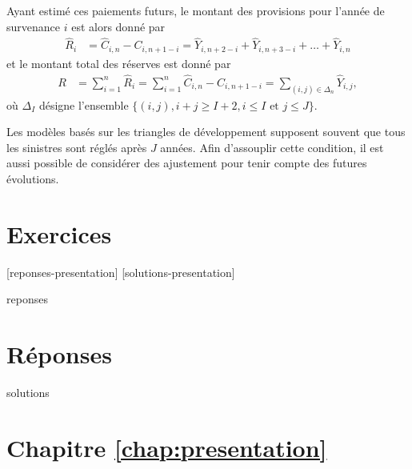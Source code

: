 Ayant estimé ces paiements futurs, le montant des provisions pour
l'année de survenance $i$ est alors donné par
\begin{align*}
  \hat{R}_i &= \hat{C}_{i,n} - C_{i, n+1-i} =
                  \hat{Y}_{i,n+2-i} + \hat{Y}_{i,n+3-i} + \dots +
                  \hat{Y}_{i,n}
\end{align*}
et le montant total des réserves est donné par
\begin{align*}
R &= \sum_{i=1}^n \hat{R}_i = \sum_{i=1}^n \hat{C}_{i,n} -
C_{i, n+1-i} = \sum_{(i,j) \in \Delta_n } \hat{Y}_{i,j},
\end{align*}
où $\Delta_I$ désigne l'ensemble
$\{(i, j), i + j \ge I + 2, i \le I \text{ et } j \le J \}$.

Les modèles basés sur les triangles de développement supposent souvent
que tous les sinistres sont réglés après $J$ années. Afin d'assouplir
cette condition, il est aussi possible de considérer des ajustement
pour tenir compte des futures évolutions.


\section{Exercices}
\label{sec:presentation:exercices}

[reponses-presentation]
[solutions-presentation]

\begin{Filesave}{reponses}
\bigskip
\section*{Réponses}

\end{Filesave}

\begin{Filesave}{solutions}
\section*{Chapitre \ref*{chap:presentation}}

\end{Filesave}

